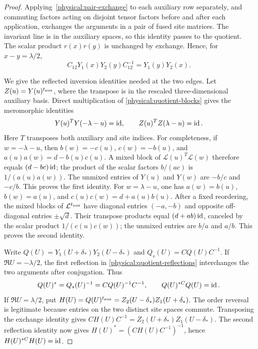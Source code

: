 \begin{proof}
Applying~\eqref{physical:pair-exchange} to each auxiliary row separately,
and commuting factors acting on disjoint tensor factors before and after
each application, exchanges the arguments in a pair of fused site
matrices. The invariant line is in the auxiliary spaces, so this identity
passes to the quotient. The scalar product $r(x)r(y)$ is unchanged by
exchange. Hence, for $x-y=\lambda/2$,
\begin{equation}\label{physical:fused-pair-exchange}
 C_{12}Y_1(x)Y_2(y)C_{12}^{-1}=Y_1(y)Y_2(x).
\end{equation}

We give the reflected inversion identities needed at the two edges.
Let $Z(u)=Y(u)^{t_{\rm aux}}$, where the transpose is in the rescaled
three-dimensional auxiliary basis. Direct multiplication of
\eqref{physical:quotient-blocks} gives the meromorphic identities
\begin{equation}\label{physical:quotient-reflections}
 Y(u)^TY(-\lambda-u)=\operatorname{id},
 \qquad Z(u)^TZ(\lambda-u)=\operatorname{id}.
\end{equation}
Here $T$ transposes both auxiliary and site indices. For completeness,
if $w=-\lambda-u$, then $b(w)=-c(u)$, $c(w)=-b(u)$, and
$a(u)a(w)=d-b(u)c(u)$. A mixed block of $\mathcal L(u)^T\mathcal L(w)$
therefore equals $(d-bc)\operatorname{id}$; the product of the scalar factors
$b/(ac)$ is $1/(a(u)a(w))$. The unmixed entries of $Y(u)$ and $Y(w)$
are $-b/c$ and $-c/b$. This proves the first identity.
For $w=\lambda-u$, one has $a(w)=b(u)$, $b(w)=a(u)$, and
$c(u)c(w)=d+a(u)b(u)$. After a fixed reordering, the mixed blocks of
$\mathcal L^{t_{\rm aux}}$ have diagonal entries $(-a,-b)$ and opposite
off-diagonal entries $\pm\sqrt d$. Their transpose products equal
$(d+ab)\operatorname{id}$, canceled by the scalar product $1/(c(u)c(w))$; the
unmixed entries are $b/a$ and $a/b$. This proves the second identity.

Write $Q(U)=Y_1(U+\delta_*)Y_2(U-\delta_*)$ and
$Q_s(U)=C Q(U)C^{-1}$. If $\Re U=-\lambda/2$, the first reflection in
\eqref{physical:quotient-reflections} interchanges the two arguments
after conjugation. Thus
\[
 Q(U)^*=Q_s(U)^{-1}=C Q(U)^{-1}C^{-1},
 \qquad Q(U)^{*C}Q(U)=\operatorname{id}.
\]
If $\Re U=\lambda/2$, put
$H(U)=Q(U)^{t_{\rm aux}}=Z_2(U-\delta_*)Z_1(U+\delta_*)$.
The order reversal is legitimate because entries on the two distinct
site spaces commute. Transposing the exchange identity gives
$C H(U)C^{-1}=Z_2(U+\delta_*)Z_1(U-\delta_*)$.
The second reflection identity now gives
$H(U)^*=(C H(U)C^{-1})^{-1}$, hence
$H(U)^{*C}H(U)=\operatorname{id}$.


\end{proof}

